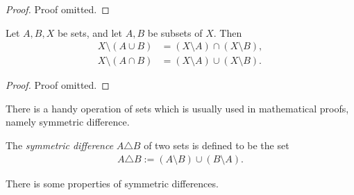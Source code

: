 \begin{proof}
    Proof omitted.
\end{proof}

\begin{proposition}
    Let $A, B, X$ be sets, and let $A, B$ be subsets of $X$. Then
    \begin{align*}
        X \setminus (A \cup B) &= (X \setminus A) \cap (X \setminus B),\\
        X \setminus (A \cap B) &= (X \setminus A) \cup (X \setminus B).
    \end{align*}
\end{proposition}

\begin{proof}
    Proof omitted.
\end{proof}

There is a handy operation of sets which is usually used in mathematical proofs, namely symmetric difference.

\begin{definition}
    The \emph{symmetric difference} $A \triangle B$ of two sets is defined to be the set
    \begin{align*}
        A \triangle B := (A \setminus B) \cup (B \setminus A).
    \end{align*}
\end{definition}

There is some properties of symmetric differences.

\begin{proposition}
    
\end{proposition}